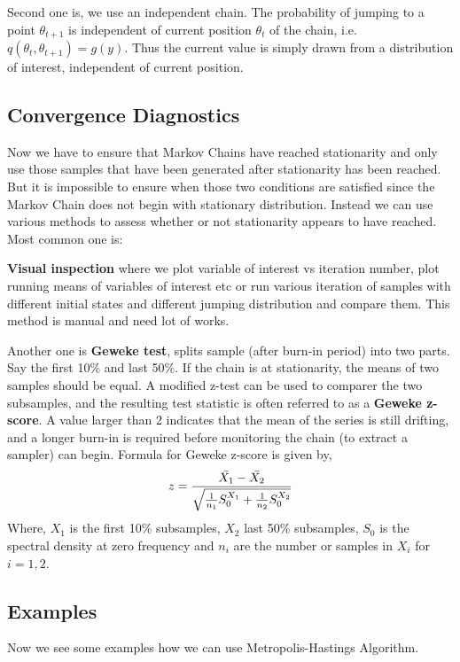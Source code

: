 Second one is, we use an independent chain. The probability of jumping to a point $ \theta_{t+1} $ is independent of current position $ \theta_t $ of the chain, i.e. $ q(\theta_t,\theta_{t+1}) = g(y) $. Thus the current value is simply drawn from a distribution of interest, independent of current position.

\subsection{Convergence Diagnostics}
Now we have to ensure that Markov Chains have reached stationarity and only use those samples that have been generated after stationarity has been reached. But it is impossible to ensure when those two conditions are satisfied since the Markov Chain does not begin with stationary distribution. Instead we can use various methods to assess whether or not stationarity appears to have reached. Most common one is:

\textbf{Visual inspection} where we plot variable of interest vs iteration number, plot running means of variables of interest etc or run various iteration of samples with different initial states and different jumping distribution and compare them. This method is manual and need lot of works.

Another one is \textbf{Geweke test}, splits sample (after burn-in period) into two parts.
Say the first 10\% and last 50\%. If the chain is at stationarity, the means of two samples should be equal. A modified z-test can be used to comparer the two subsamples,
and the resulting test statistic is often referred to as a \textbf{Geweke z-score}.
A value larger than 2 indicates that the mean of
the series is still drifting, and a longer burn-in is required before monitoring the
chain (to extract a sampler) can begin. Formula for Geweke z-score is given by,
\[
    z = \frac{\Bar{X_1} - \Bar{X_2}}{\sqrt{ \frac{ 1 }{ n_1 }S^{X_1}_0 + \frac{ 1 }{ n_2 }S^{X_2}_0 }}
\]
Where, $ X_1 $ is the first 10\% subsamples, $ X_2 $ last 50\% subsamples, $ S_0 $ is the spectral density at zero frequency and $ n_i $ are the number or samples in $ X_i $ for $ i = 1,2 $.

\subsection{Examples}

Now we see some examples how we can use Metropolis-Hastings Algorithm. 

